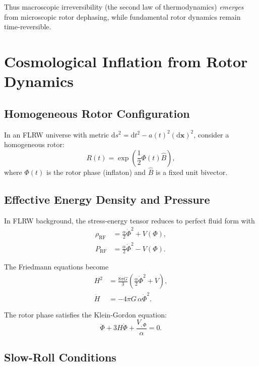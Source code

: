 \documentclass[11pt,a4paper]{article}
\numberwithin{equation}{section}
\theoremstyle{plain}
\theoremstyle{definition}
\theoremstyle{remark}
\newcommand{\dd}{\mathrm{d}}
\begin{document}
Thus macroscopic irreversibility (the second law of thermodynamics) \emph{emerges} from microscopic rotor dephasing, while fundamental rotor dynamics remain time-reversible.

\section{Cosmological Inflation from Rotor Dynamics}
\label{sec:inflation}

\subsection{Homogeneous Rotor Configuration}

In an FLRW universe with metric $\dd s^2 = \dd t^2 - a(t)^2(\dd\mathbf{x})^2$, consider a homogeneous rotor:
\begin{equation}
R(t) = \exp\left(\frac{1}{2}\Phi(t)\hat{B}\right),
\end{equation}
where $\Phi(t)$ is the rotor phase (inflaton) and $\hat{B}$ is a fixed unit bivector.

\subsection{Effective Energy Density and Pressure}

In FLRW background, the stress-energy tensor reduces to perfect fluid form with
\begin{align}
\rho_{\mathrm{RF}} &= \frac{\alpha}{2}\dot{\Phi}^2 + V(\Phi),\\
P_{\mathrm{RF}} &= \frac{\alpha}{2}\dot{\Phi}^2 - V(\Phi).
\end{align}

The Friedmann equations become
\begin{align}
H^2 &= \frac{8\pi G}{3}\left(\frac{\alpha}{2}\dot{\Phi}^2 + V\right),\\
\dot{H} &= -4\pi G\,\alpha\dot{\Phi}^2.
\end{align}

The rotor phase satisfies the Klein-Gordon equation:
\begin{equation}
\ddot{\Phi} + 3H\dot{\Phi} + \frac{V_{,\Phi}}{\alpha} = 0.
\label{eq:inflation-kg}
\end{equation}

\subsection{Slow-Roll Conditions}
\end{document}
